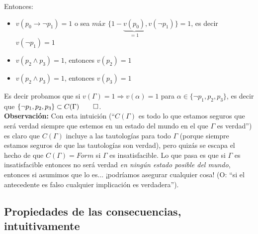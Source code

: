 \documentclass[10pt,a4paper]{article}
\newcommand{\G}{\Gamma}
\newcommand{\ra}{\rightarrow}
\newcommand{\Ra}{\Rightarrow}
\renewcommand{\a}{\alpha}
\begin{document}
Entonces:

\begin{itemize}
\item $v(p_0 \ra \neg p_1) = 1$ o sea $\textit{máx \{} 1 - \underbrace{v(p_0)}_{=1}, v(\neg p_1) \} = 1$, es decir $v(\neg p_1) = 1$
\item $v(p_2 \land p_3) = 1$, entonces $v(p_2) = 1$
\item $v(p_2 \land p_3) = 1$, entonces $v(p_3) = 1$
\end{itemize}

Es decir probamos que si $v(\G) = 1 \Ra v(\a) = 1$ para $\a \in \{ \neg p_1, p_2, p_3 \}$, es decir que $\{ \neg p_1, p_2, p_3 \} \subset C(\G) \qed$.\\
 

\textbf{Observación:} Con esta intuición (``$C(\G)$ es todo lo que estamos seguros que será verdad siempre que estemos en un estado del mundo en el que $\G$ es verdad'') es claro que $C(\G)$ incluye a las tautologías para todo $\G$ (porque siempre estamos seguros de que las tautologías son verdad), pero quizás se escapa el hecho de que $C(\G) = Form$ si $\G$ es insatisfacible. Lo que pasa es que si $\G$ es insatisfacible entonces no será verdad \textit{en ningún estado posible del mundo}, entonces si asumimos que lo es... ¡podríamos asegurar cualquier cosa! (O: ``si el antecedente es falso cualquier  implicación es verdadera'').


\subsection*{Propiedades de las consecuencias, intuitivamente}


\vspace{10px}
\vspace{10px}


\vspace{10px}
\vspace{10px}
\end{document}
